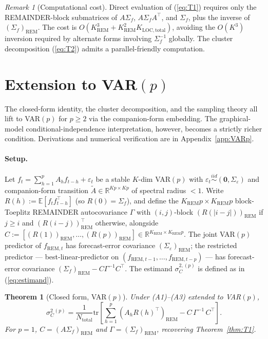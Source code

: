 \documentclass[11pt,letterpaper]{article}
\newtheorem{theorem}{Theorem}
\theoremstyle{remark}
\newtheorem{remark}{Remark}
\newcommand{\REM}{\mathrm{REM}}
\newcommand{\LOC}{\mathrm{LOC}}
\newcommand{\Sigmaf}{\Sigma_f}
\newcommand{\Sigmae}{\Sigma_\varepsilon}
\newcommand{\Ntot}{N_{\mathrm{total}}}
\newcommand{\trace}{\mathrm{tr}}
\newcommand{\E}{\mathbb{E}}
\begin{document}
\begin{remark}[Computational cost]\label{rem:cost}
Direct evaluation of (\ref{eq:T1}) requires only the REMAINDER-block submatrices of $A \Sigma_f$, $A \Sigma_f A^\top$, and $\Sigma_f$, plus the inverse of $(\Sigma_f)_\REM$. The cost is $O(K_\REM^3 + K_\REM^2 K_{\LOC, \mathrm{total}})$, avoiding the $O(K^3)$ inversion required by alternate forms involving $\Sigma_f^{-1}$ globally. The cluster decomposition (\ref{eq:T2}) admits a parallel-friendly computation.
\end{remark}

\section{Extension to VAR$(p)$}\label{sec:varp}

The closed-form identity, the cluster decomposition, and the sampling theory all lift to VAR$(p)$ for $p \ge 2$ via the companion-form embedding. The graphical-model conditional-independence interpretation, however, becomes a strictly richer condition. Derivations and numerical verification are in Appendix~\ref{app:VARp}.

\paragraph{Setup.} Let $f_t = \sum_{h=1}^{p} A_h f_{t-h} + \varepsilon_t$ be a stable $K$-dim VAR$(p)$ with $\varepsilon_t \stackrel{iid}{\sim} (\mathbf{0}, \Sigmae)$ and companion-form transition $\widetilde A \in \mathbb{R}^{Kp \times Kp}$ of spectral radius $< 1$. Write $R(h) := \E[f_t f_{t-h}^\top]$ (so $R(0) = \Sigmaf$), and define the $K_\REM p \times K_\REM p$ block-Toeplitz REMAINDER autocovariance $\Gamma$ with $(i, j)$-block $(R(|i-j|))_\REM$ if $j \ge i$ and $(R(i-j))_\REM^\top$ otherwise, alongside $C := [(R(1))_\REM, \ldots, (R(p))_\REM] \in \mathbb{R}^{K_\REM \times K_\REM p}$. The joint VAR$(p)$ predictor of $f_{\REM, t}$ has forecast-error covariance $(\Sigmae)_\REM$; the restricted predictor --- best-linear-predictor on $(f_{\REM, t-1}, \ldots, f_{\REM, t-p})$ --- has forecast-error covariance $(\Sigmaf)_\REM - C \Gamma^{-1} C^\top$. The estimand $\sigma^{2,(p)}_C$ is defined as in (\ref{eq:estimand}).

\begin{theorem}[Closed form, VAR$(p)$]\label{thm:T1p}
Under (A1)--(A3) extended to VAR$(p)$,
\begin{equation}\label{eq:T1p}
\sigma^2_C{}^{(p)} = \frac{1}{\Ntot} \trace\!\left[\sum_{h=1}^{p} (A_h R(h)^\top)_\REM - C\,\Gamma^{-1}\,C^\top\right].
\end{equation}
For $p = 1$, $C = (A\Sigmaf)_\REM$ and $\Gamma = (\Sigmaf)_\REM$, recovering Theorem~\ref{thm:T1}.
\end{theorem}
\end{document}
